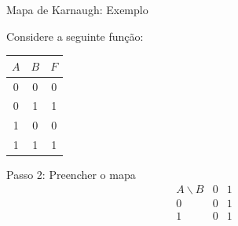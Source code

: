 \begin{frame}{Mapa de Karnaugh: Exemplo}
    \small

    Considere a seguinte função:

    \begin{center}
        \begin{tabular}{c c | c}
            $A$ & $B$ & $F$ \\ \hline
            0 & 0 & 0 \\
            0 & 1 & 1 \\
            1 & 0 & 0 \\
            1 & 1 & 1
        \end{tabular}
    \end{center}


    \begin{block}{Passo 2: Preencher o mapa}
        \[
        \begin{array}{c|cc}
            A\backslash B & 0 & 1 \\ \hline
            0 & 0 & \boxed{1} \\
            1 & 0 & \boxed{1}
        \end{array}
        \]
    \end{block}

\end{frame}